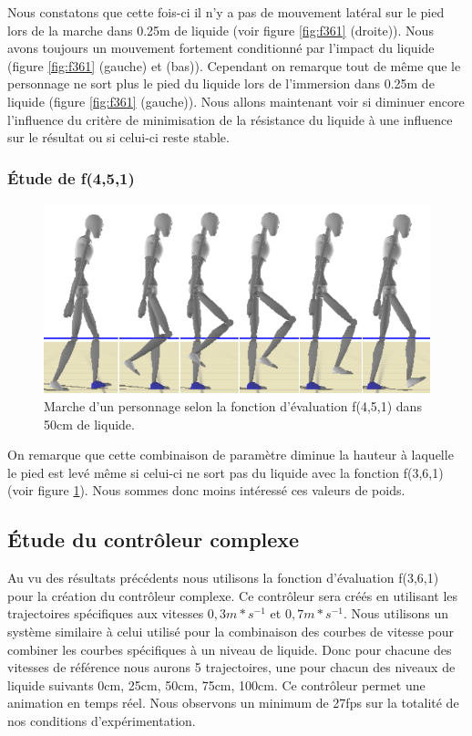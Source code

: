 \documentclass[runningheads,a4paper]{llncs}
\begin{document}
Nous constatons que cette fois-ci il n'y a pas de mouvement latéral sur le pied lors de la marche dans 0.25m de liquide (voir figure \ref{fig:f361} (droite)). Nous avons toujours un mouvement fortement conditionné par l'impact du liquide (figure \ref{fig:f361} (gauche) et (bas)). Cependant on remarque tout de même que le personnage ne sort plus le pied du liquide lors de l'immersion dans 0.25m de liquide (figure \ref{fig:f361} (gauche)). Nous allons maintenant voir si diminuer encore l'influence du critère de minimisation de la résistance du liquide à une influence sur le résultat ou si celui-ci reste stable.

\vspace*{-0.75cm}
\subsubsection{Étude de f(4,5,1)}
\begin{figure}[h]
\centering
\includegraphics[scale=0.4]{strips/4_5_1_50cm.png}
\caption{Marche d'un personnage selon la fonction d'évaluation f(4,5,1) dans 50cm de liquide.}
\label{fig:f451}
\end{figure}

On remarque que cette combinaison de paramètre diminue la hauteur à laquelle le pied est levé même si celui-ci ne sort pas du liquide avec la fonction f(3,6,1) (voir figure \ref{fig:f451}). Nous sommes donc moins intéressé ces valeurs de poids. 

\subsection{Étude du contrôleur complexe}

Au vu des résultats précédents nous utilisons la fonction d'évaluation f(3,6,1) pour la création du contrôleur complexe. Ce contrôleur sera créés en utilisant les trajectoires spécifiques aux vitesses $0,3m*s^{-1}$ et $0,7m*s^{-1}$. Nous utilisons un système similaire à celui utilisé pour la combinaison des courbes de vitesse pour combiner les courbes spécifiques à un niveau de liquide. Donc pour chacune des vitesses de référence nous aurons 5 trajectoires, une pour chacun des niveaux de liquide suivants 0cm, 25cm, 50cm, 75cm, 100cm. Ce contrôleur permet une animation en temps réel. Nous observons un minimum de 27fps sur la totalité de nos conditions d'expérimentation.
\end{document}
